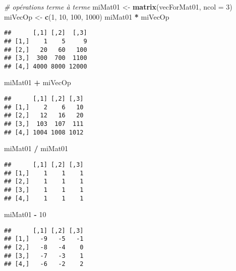 \documentclass[]{book}
\newenvironment{Shaded}{\begin{snugshade}}{\end{snugshade}}
\newcommand{\KeywordTok}[1]{\textcolor[rgb]{0.13,0.29,0.53}{\textbf{#1}}}
\newcommand{\DataTypeTok}[1]{\textcolor[rgb]{0.13,0.29,0.53}{#1}}
\newcommand{\DecValTok}[1]{\textcolor[rgb]{0.00,0.00,0.81}{#1}}
\newcommand{\StringTok}[1]{\textcolor[rgb]{0.31,0.60,0.02}{#1}}
\newcommand{\CommentTok}[1]{\textcolor[rgb]{0.56,0.35,0.01}{\textit{#1}}}
\newcommand{\OperatorTok}[1]{\textcolor[rgb]{0.81,0.36,0.00}{\textbf{#1}}}
\newcommand{\NormalTok}[1]{#1}
\theoremstyle{definition}
\theoremstyle{definition}
\theoremstyle{definition}
\theoremstyle{remark}
\begin{document}
\begin{Shaded}
\begin{Highlighting}[]
\CommentTok{# opérations terme à terme}
\NormalTok{miMat01 <-}\StringTok{ }\KeywordTok{matrix}\NormalTok{(vecForMat01, }\DataTypeTok{ncol =} \DecValTok{3}\NormalTok{)}
\NormalTok{miVecOp <-}\StringTok{ }\KeywordTok{c}\NormalTok{(}\DecValTok{1}\NormalTok{, }\DecValTok{10}\NormalTok{, }\DecValTok{100}\NormalTok{, }\DecValTok{1000}\NormalTok{)}
\NormalTok{miMat01 }\OperatorTok{*}\StringTok{ }\NormalTok{miVecOp}
\end{Highlighting}
\end{Shaded}

\begin{verbatim}
##      [,1] [,2]  [,3]
## [1,]    1    5     9
## [2,]   20   60   100
## [3,]  300  700  1100
## [4,] 4000 8000 12000
\end{verbatim}

\begin{Shaded}
\begin{Highlighting}[]
\NormalTok{miMat01 }\OperatorTok{+}\StringTok{ }\NormalTok{miVecOp}
\end{Highlighting}
\end{Shaded}

\begin{verbatim}
##      [,1] [,2] [,3]
## [1,]    2    6   10
## [2,]   12   16   20
## [3,]  103  107  111
## [4,] 1004 1008 1012
\end{verbatim}

\begin{Shaded}
\begin{Highlighting}[]
\NormalTok{miMat01 }\OperatorTok{/}\StringTok{ }\NormalTok{miMat01}
\end{Highlighting}
\end{Shaded}

\begin{verbatim}
##      [,1] [,2] [,3]
## [1,]    1    1    1
## [2,]    1    1    1
## [3,]    1    1    1
## [4,]    1    1    1
\end{verbatim}

\begin{Shaded}
\begin{Highlighting}[]
\NormalTok{miMat01 }\OperatorTok{-}\StringTok{ }\DecValTok{10}
\end{Highlighting}
\end{Shaded}

\begin{verbatim}
##      [,1] [,2] [,3]
## [1,]   -9   -5   -1
## [2,]   -8   -4    0
## [3,]   -7   -3    1
## [4,]   -6   -2    2
\end{verbatim}
\end{document}
